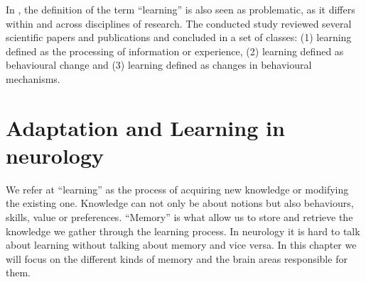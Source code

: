 \documentclass[conference]{IEEEtran}
\begin{document}
	In \cite{b6}, the definition of the term “learning” is also seen as problematic, as it differs within and across disciplines of research. The conducted study reviewed several scientific papers and publications and concluded in a set of classes: (1) learning defined as the processing of information or experience, (2) learning defined as behavioural change and (3) learning defined as changes in behavioural mechanisms.

\section{Adaptation and Learning in neurology}
	We refer at ``learning'' as the process of acquiring new knowledge or modifying the existing one. Knowledge can not only be about notions but also behaviours, skills, value or preferences.\cite{b7}
	``Memory'' is what allow us to store and retrieve the knowledge we gather through the learning process.
	In neurology it is hard to talk about learning without talking about memory and vice versa. In this chapter we will focus on the different kinds of memory and the brain areas responsible for them.
\end{document}

